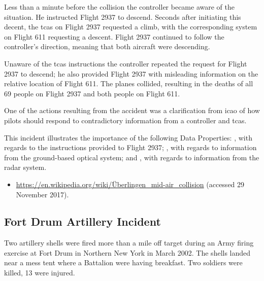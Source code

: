 Less than a minute before the collision the controller became aware of the situation. He instructed Flight 2937 to descend. Seconds after initiating this decent, the \gls{tcas} on Flight 2937 requested a climb, with the corresponding system on Flight 611 requesting a descent. Flight 2937 continued to follow the controller's direction, meaning that both aircraft were descending.

Unaware of the \gls{tcas} instructions the controller repeated the request for Flight 2937 to descend; he also provided Flight 2937 with misleading information on the relative location of Flight 611. The planes collided, resulting in the deaths of all 69 people on Flight 2937 and both people on Flight 611.

One of the actions resulting from the accident was a clarification from \gls{icao} of how pilots should respond to contradictory information from a controller and \gls{tcas}.

This incident illustrates the importance of the following Data Properties: , with regards to the instructions provided to Flight 2937; , with regards to information from the ground-based optical system; and , with regards to information from the radar system.

\begin{samepage}
\begin{itemize}
	\item \raggedright{\href{https://en.wikipedia.org/wiki/\%C3\%9Cberlingen_mid-air_collision}{https://en.wikipedia.org/wiki/\"Uberlingen\_mid-air\_collision} (accessed 29 November 2017).}
\end{itemize}
\end{samepage}


\subsection{Fort Drum Artillery Incident} \label{bkm:incacc:fortdrum}
Two artillery shells were fired more than a mile off target during an Army firing exercise at Fort Drum in Northern New York in March 2002. The shells landed near a mess tent where a Battalion were having breakfast. Two soldiers were killed, 13 were injured. 

